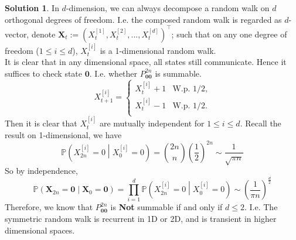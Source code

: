 \documentclass[a4paper, 10pt]{article}
\theoremstyle{definition}
\theoremstyle{hSol}
\newtheorem*{solution}{Solution}
\begin{document}
\begin{solution} In $d$-dimension, we can always decompose a random walk on $d$ orthogonal degrees of freedom. I.e. the composed random walk is regarded as $d$-vector, denote $\bm{X}_t := (X_t^{[1]}, X_t^{[2]}, ..., X_t^{[d]})^{\top}$; such that on any one degree of freedom ($1\leq i\leq d$), $X_t^{[i]}$ is a 1-dimensional random walk. \\
It is clear that in any dimensional space, all states still communicate. Hence it suffices to check state $\bm{0}$. I.e. whether $P_{\bm{00}}^{2n}$ is summable.
\begin{equation}
  X_{t+1}^{[i]} = \begin{cases}
  X_t^{[i]} + 1 & \text{W.p. $1/2$,}\\
  X_t^{[i]} - 1 & \text{W.p. $1/2$.}\\
  \end{cases}
\end{equation}
Then it is clear that $X_{t}^{[i]}$ are mutually independent for $1\leq i\leq d$. Recall the result on 1-dimensional, we have
\begin{equation}
  \mathbb{P}\left(X_{2n}^{[i]}=0\middle|X_{0}^{[i]}=0\right) = \binom{2n}{n}\left(\frac{1}{2}\right)^{2n}\sim \frac{1}{\sqrt{\pi n}}
\end{equation}
So by independence,
\begin{equation}
  \mathbb{P}\left(\bm{X}_{2n}=\bm{0}\middle|\bm{X}_0=\bm{0}\right) = \prod_{i=1}^d \mathbb{P}\left(X_{2n}^{[i]}=0\middle|X_{0}^{[i]}=0\right) \sim \left(\frac{1}{\pi n}\right)^{\frac{d}{2}}
\end{equation}
Therefore, we know that $P^{2n}_{\bm{00}}$ is \textbf{Not} summable if and only if $d\leq 2$. I.e. The symmetric random walk is recurrent in 1D or 2D, and is transient in higher dimensional spaces.
\end{solution}
\end{document}
